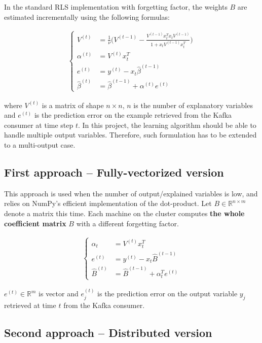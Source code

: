 In the standard RLS implementation with forgetting factor,
the weights $B$ are estimated incrementally using the following formulas:

\begin{align}
\begin{cases}
    V^{(t)} & = \frac{1}{\nu} \Bigg( V^{(t-1)} - \frac{V^{(t-1)} x_t^T x_t V^{(t-1)}}{1 + x_t V^{(t-1)} x_t^T} \Bigg) \\
    \alpha^{(t)} & = V^{(t)} x_t^T \\
    e^{(t)} & = y^{(t)} - x_t \hat{\beta}^{(t-1)} \\
    \hat{\beta}^{(t)} & = \hat{\beta}^{(t-1)} + \alpha^{(t)} e^{(t)}
\end{cases}
\end{align}

where $V^{(t)}$ is a matrix of shape $n \times n$, $n$ is the number of explanatory variables
and $e^{(t)}$ is the prediction error on the example retrieved from the Kafka consumer at time step $t$.
In this project, the learning algorithm should be able to handle multiple output variables.
Therefore, such formulation has to be extended to a multi-output case.

\subsection{First approach -- Fully-vectorized version}

This approach is used when the number of output/explained variables is low,
and relies on NumPy's efficient implementation of the dot-product.
Let $B \in \mathbb{R}^{n \times m}$ denote a matrix this time.
Each machine on the cluster computes \textbf{the whole coefficient matrix} $B$
with a different forgetting factor.

\begin{align}
\begin{cases}
    \alpha_t & = V^{(t)} x_t^T \\
    e^{(t)} & = y^{(t)} - x_t \hat{B}^{(t-1)} \\
    \hat{B}^{(t)} & = \hat{B}^{(t-1)} + \alpha_t^T e^{(t)}
\end{cases}
\end{align}

$e^{(t)} \in \mathbb{R}^m$ is vector and $e_j^{(t)}$ is the prediction error
on the output variable $y_j$ retrieved at time $t$ from the Kafka consumer.


\subsection{Second approach -- Distributed version}

